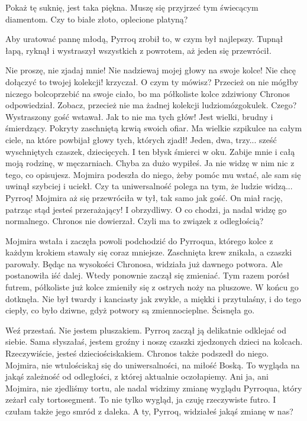 \begin{dialogue}
\ds{} Pokaż tę suknię, jest taka piękna.
\ds{} Muszę się przyjrzeć tym świecącym diamentom.
\ds{} Czy to białe złoto, oplecione platyną?
\end{dialogue}

Aby uratować pannę młodą, Pyrroq zrobił to, w czym był najlepszy. Tupnął łapą, ryknął i wystraszył wszystkich z powrotem, aż jeden się przewrócił.

\begin{dialogue}
\ds{} Nie proszę, nie zjadaj mnie! Nie nadziewaj mojej głowy na swoje kolce! Nie chcę dołączyć to twojej kolekcji! \dm{} krzyczał.
\ds{} O czym ty mówisz? Przecież on nie mógłby niczego bolcoprzebić na swoje ciało, bo ma półkoliste kolce \dm{} zdziwiony Chronos odpowiedział. \dm{}
Zobacz, przecież nie ma żadnej kolekcji ludziomózgokulek.
\ds{} Czego? \dm{} Wystraszony gość wstawał. \dm{} Jak to nie ma tych głów! Jest wielki, brudny i śmierdzący. Pokryty zaschniętą krwią swoich ofiar.
Ma wielkie szpikulce na całym ciele, na które powbijał głowy tych, których zjadł! Jeden, dwa, trzy... sześć wyschniętych czaszek, dziecięcych.
I ten błysk śmierci w oku. Zabije mnie i całą moją rodzinę, w męczarniach.
\ds{} Chyba za dużo wypiłeś. Ja nie widzę w nim nic z tego, co opisujesz. \dm{} Mojmira podeszła do niego, żeby pomóc mu wstać, ale sam się uwinął szybciej i uciekł. \dm{}
Czy ta uniwersalność polega na tym, że ludzie widzą... Pyrroq! \dm{} Mojmira aż się przewróciła w tył, tak samo jak gość. \dm{} 
On miał rację, patrząc stąd jesteś przerażający! I obrzydliwy.
\ds{} O co chodzi, ja nadal widzę go normalnego. \dm{} Chronos nie dowierzał.
\ds{} Czyli ma to związek z odległością?
\end{dialogue}

Mojmira wstała i zaczęła powoli podchodzić do Pyrroqua, którego kolce z każdym krokiem stawały się coraz mniejsze. Zaschnięta krew znikała, a czaszki parowały. 
Będąc na wysokości Chronosa, widziała już dawnego potwora.
Ale postanowiła iść dalej. Wtedy ponownie zaczął się zmieniać.
Tym razem porósł futrem, półkoliste już kolce zmieniły się z ostrych noży na pluszowe.
W końcu go dotknęła.
Nie był twardy i kanciasty jak zwykle, a miękki i przytulaśny, i do tego ciepły, co było dziwne, gdyż potwory są zmiennocieplne.
Ścisnęła go.

\begin{dialogue}
\ds{} Weź przestań. Nie jestem pluszakiem. \dm{} Pyrroq zaczął ją delikatnie odklejać od siebie. \dm{}
Sama słyszałaś, jestem groźny i noszę czaszki zjedzonych dzieci na kolcach.
\ds{} Rzeczywiście, jesteś dzieciościskakiem. \dm{} Chronos także podszedł do niego. \dm{} Mojmira, nie wtulościskaj się do uniwersalności, na miłość Boską.
To wygląda na jakąś zależność od odległości, z której aktualnie oczołapiemy. 
Ani ja, ani Mojmira, nie zjedliśmy tortu, ale nadal widzimy zmianę wyglądu Pyrroqua, który zeżarł cały tortosegment.
\ds{} To nie tylko wygląd, ja czuję rzeczywiste futro. I czułam także jego smród z daleka. A ty, Pyrroq, widziałeś jakąś zmianę w nas?
\end{dialogue}

